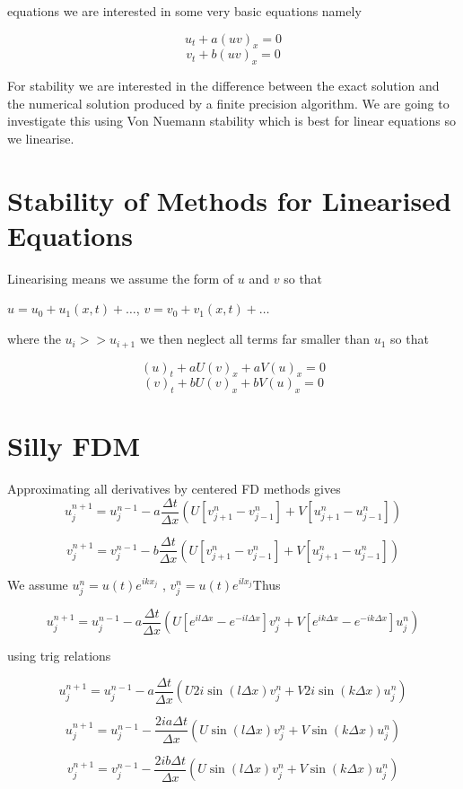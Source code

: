 \documentclass[12pt]{article}
\begin{document}
	equations we are interested in some very basic equations namely
	
	\[u_t + a(uv)_x = 0\]
	\[v_t + b(uv)_x = 0\]
	
For stability we are interested in the difference between the exact solution and the numerical solution produced by a finite precision algorithm. We are going to investigate this using Von Nuemann stability which is best for linear equations so we linearise. 
\section{Stability of Methods for Linearised Equations}

Linearising means we assume the form of $u$ and $v$ so that

$u = u_0 + u_1(x,t) + \dots$,
$v = v_0 + v_1(x,t) + \dots$

where the $u_{i} >> u_{i+1}$ we then neglect all terms far smaller than $u_1$ so that

	\[(u)_t + aU(v)_x + aV(u)_x = 0\]
	\[(v)_t + bU(v)_x + bV(u)_x = 0\]
	
\section{Silly FDM}
Approximating all derivatives by centered FD methods gives
	\[u^{n+1}_j = u^{n-1}_j - a\frac{\Delta t}{\Delta x}\left(U\left[v^{n}_{j + 1} - v^{n}_{j - 1}\right] + V\left[u^{n}_{j + 1} - u^{n}_{j - 1}\right]\right)\]
	
		\[v^{n+1}_j = v^{n-1}_j - b\frac{\Delta t}{\Delta x}\left(U\left[v^{n}_{j + 1} - v^{n}_{j - 1}\right] + V\left[u^{n}_{j + 1} - u^{n}_{j - 1}\right]\right)\]

We assume $u^n_j = u(t)e^{ikx_j}$ , $v^n_j = u(t)e^{ilx_j}$Thus 

	\[u^{n+1}_j = u^{n-1}_j - a\frac{\Delta t}{\Delta x}\left(U\left[e^{il\Delta x} - e^{-il\Delta x}\right]v^{n}_{j} + V\left[e^{ik\Delta x} - e^{-ik\Delta x}\right] u^{n}_{j}\right)\]
	
	using trig relations
	
	
		\[u^{n+1}_j = u^{n-1}_j - a\frac{\Delta t}{\Delta x}\left(U2i\sin\left(l\Delta x\right)v^{n}_{j} + V2i\sin\left(k\Delta x\right) u^{n}_{j}\right)\]
		
			\[u^{n+1}_j = u^{n-1}_j - \frac{2ia\Delta t}{\Delta x}\left(U\sin\left(l\Delta x\right)v^{n}_{j} + V\sin\left(k\Delta x\right) u^{n}_{j}\right)\]

			\[v^{n+1}_j = v^{n-1}_j - \frac{2ib\Delta t}{\Delta x}\left(U\sin\left(l\Delta x\right)v^{n}_{j} + V\sin\left(k\Delta x\right) u^{n}_{j}\right)\]
			
\end{document}

